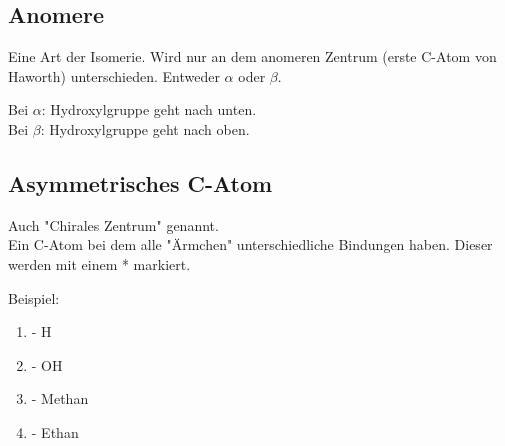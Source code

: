 \subsection{Anomere}
Eine Art der Isomerie. 
Wird nur an dem anomeren Zentrum (erste C-Atom von Haworth) unterschieden.
Entweder $\alpha$ oder $\beta$. 

Bei $\alpha$: Hydroxylgruppe geht nach unten.\\
Bei $\beta$: Hydroxylgruppe geht nach oben.


\subsection{Asymmetrisches C-Atom}
Auch "Chirales Zentrum" genannt. \\
Ein C-Atom bei dem alle "Ärmchen" unterschiedliche Bindungen haben. Dieser werden mit einem * markiert.

Beispiel:
\begin{enumerate}
    \item - H
    \item - OH
    \item - Methan
    \item - Ethan
\end{enumerate}

